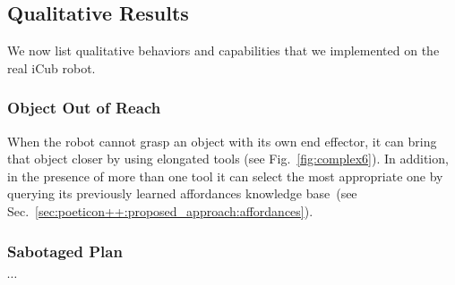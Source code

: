 \subsection{Qualitative Results}
\label{sec:poeticon++:results:qualitative}

We now list qualitative behaviors and capabilities that we implemented on the real iCub robot.

\subsubsection{Object Out of Reach}

When the robot cannot grasp an object with its own end effector, it can bring that object closer by using elongated tools (see Fig.~\ref{fig:complex6}). In addition, in the presence of more than one tool it can select the most appropriate one by querying its previously learned \toolobj{} affordances knowledge base~(see Sec.~\ref{sec:poeticon++:proposed_approach:affordances}).

\subsubsection{Sabotaged Plan}
\label{sec:poeticon++:results:qualitative:sabotage}

\begin{figure*}
\centering
{} \quad
%
 \quad
%
 \quad
%
 $\cdots$
%
\caption[Temporal snapshots of the robot during the Sabotaged Plan qualitative example.]{Temporal snapshots of the robot during the Sabotaged Plan qualitative example~(see Sec.~\ref{sec:poeticon++:results:qualitative:sabotage}).}
\label{fig:sabotage}
\end{figure*}

